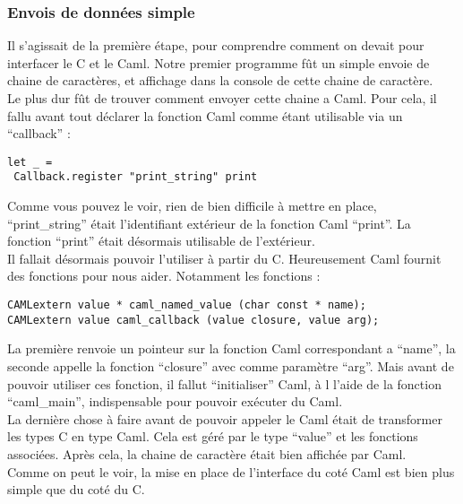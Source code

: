 \documentclass[a4paper,12pt]{article}
\begin{document}
		\subsubsection{Envois de données simple}
Il s'agissait de la première étape, pour comprendre comment on devait pour
interfacer le C et le Caml. Notre premier programme fût un simple envoie de
chaine de caractères, et affichage dans la console de cette chaine de
caractère.\\
Le plus dur fût de trouver comment envoyer cette chaine a Caml. Pour cela, il
fallu avant tout déclarer la fonction Caml comme étant utilisable via un
``callback'' :
\begin{verbatim}
let _ =
 Callback.register "print_string" print
\end{verbatim}
Comme vous pouvez le voir, rien de bien difficile à mettre en place,
``print\_string'' était l'identifiant extérieur de la fonction Caml ``print''.
La fonction ``print'' était désormais utilisable de l'extérieur.\\
Il fallait désormais pouvoir l'utiliser à partir du C. Heureusement Caml fournit
des fonctions pour nous aider. Notamment les fonctions :
\begin{verbatim}
CAMLextern value * caml_named_value (char const * name);
CAMLextern value caml_callback (value closure, value arg);
\end{verbatim}
La première renvoie un pointeur sur la fonction Caml correspondant a ``name'',
la seconde appelle la fonction ``closure'' avec comme paramètre ``arg''. Mais
avant de pouvoir utiliser ces fonction, il fallut ``initialiser'' Caml, à l
l'aide de la fonction ``caml\_main'', indispensable pour pouvoir exécuter du
Caml.\\
La dernière chose à faire avant de pouvoir appeler le Caml était de transformer
les types C en type Caml. Cela est géré par le type ``value'' et les fonctions
associées. Après cela, la chaine de caractère était bien affichée par Caml.\\
Comme on peut le voir, la mise en place de l'interface du coté Caml est bien
plus simple que du coté du C.\\
\end{document}
